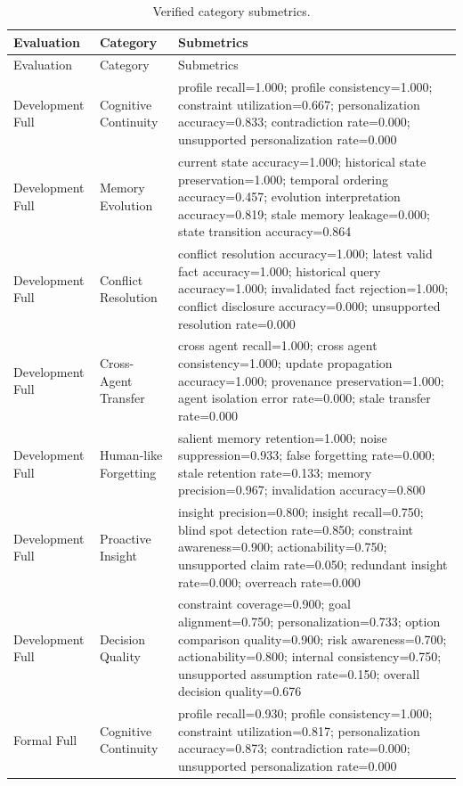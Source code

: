 \begin{longtable}{p{}p{}p{}}
\caption{Verified category submetrics.}\label{tab:category-submetrics}\\
\toprule Evaluation & Category & Submetrics \\ \midrule
\endfirsthead
\toprule Evaluation & Category & Submetrics \\ \midrule
\endhead
Development Full & Cognitive Continuity & profile recall=1.000; profile consistency=1.000; constraint utilization=0.667; personalization accuracy=0.833; contradiction rate=0.000; unsupported personalization rate=0.000 \\
Development Full & Memory Evolution & current state accuracy=1.000; historical state preservation=1.000; temporal ordering accuracy=0.457; evolution interpretation accuracy=0.819; stale memory leakage=0.000; state transition accuracy=0.864 \\
Development Full & Conflict Resolution & conflict resolution accuracy=1.000; latest valid fact accuracy=1.000; historical query accuracy=1.000; invalidated fact rejection=1.000; conflict disclosure accuracy=0.000; unsupported resolution rate=0.000 \\
Development Full & Cross-Agent Transfer & cross agent recall=1.000; cross agent consistency=1.000; update propagation accuracy=1.000; provenance preservation=1.000; agent isolation error rate=0.000; stale transfer rate=0.000 \\
Development Full & Human-like Forgetting & salient memory retention=1.000; noise suppression=0.933; false forgetting rate=0.000; stale retention rate=0.133; memory precision=0.967; invalidation accuracy=0.800 \\
Development Full & Proactive Insight & insight precision=0.800; insight recall=0.750; blind spot detection rate=0.850; constraint awareness=0.900; actionability=0.750; unsupported claim rate=0.050; redundant insight rate=0.000; overreach rate=0.000 \\
Development Full & Decision Quality & constraint coverage=0.900; goal alignment=0.750; personalization=0.733; option comparison quality=0.900; risk awareness=0.700; actionability=0.800; internal consistency=0.750; unsupported assumption rate=0.150; overall decision quality=0.676 \\
Formal Full & Cognitive Continuity & profile recall=0.930; profile consistency=1.000; constraint utilization=0.817; personalization accuracy=0.873; contradiction rate=0.000; unsupported personalization rate=0.000 \\

\end{longtable}
